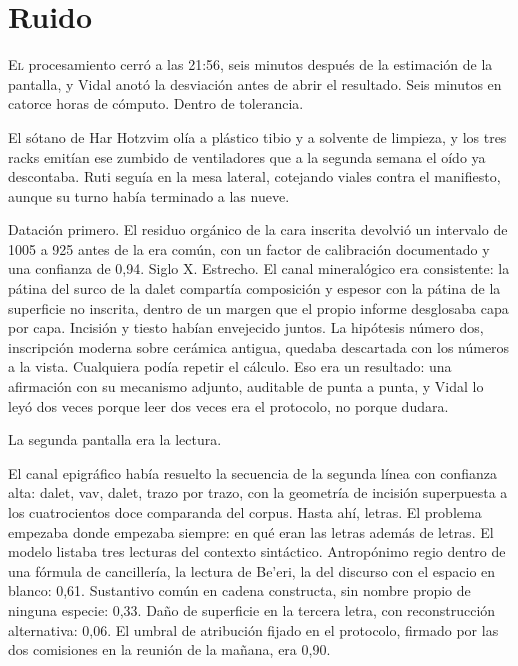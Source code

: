 \clearpage

\chapter{Ruido}

\lettrine[lines=2, lhang=0.1, nindent=0.2em]{E}{l} procesamiento cerró a las 21:56, seis minutos después de la estimación de la pantalla, y Vidal anotó la desviación antes de abrir el resultado. Seis minutos en catorce horas de cómputo. Dentro de tolerancia.


El sótano de Har Hotzvim olía a plástico tibio y a solvente de limpieza, y los tres racks emitían ese zumbido de ventiladores que a la segunda semana el oído ya descontaba. Ruti seguía en la mesa lateral, cotejando viales contra el manifiesto, aunque su turno había terminado a las nueve.

Datación primero. El residuo orgánico de la cara inscrita devolvió un intervalo de 1005 a 925 antes de la era común, con un factor de calibración documentado y una confianza de 0,94. Siglo X. Estrecho. El canal mineralógico era consistente: la pátina del surco de la dalet compartía composición y espesor con la pátina de la superficie no inscrita, dentro de un margen que el propio informe desglosaba capa por capa. Incisión y tiesto habían envejecido juntos. La hipótesis número dos, inscripción moderna sobre cerámica antigua, quedaba descartada con los números a la vista. Cualquiera podía repetir el cálculo. Eso era un resultado: una afirmación con su mecanismo adjunto, auditable de punta a punta, y Vidal lo leyó dos veces porque leer dos veces era el protocolo, no porque dudara.

La segunda pantalla era la lectura.

El canal epigráfico había resuelto la secuencia de la segunda línea con confianza alta: dalet, vav, dalet, trazo por trazo, con la geometría de incisión superpuesta a los cuatrocientos doce comparanda del corpus. Hasta ahí, letras. El problema empezaba donde empezaba siempre: en qué eran las letras además de letras. El modelo listaba tres lecturas del contexto sintáctico. Antropónimo regio dentro de una fórmula de cancillería, la lectura de Be'eri, la del discurso con el espacio en blanco: 0,61. Sustantivo común en cadena constructa, sin nombre propio de ninguna especie: 0,33. Daño de superficie en la tercera letra, con reconstrucción alternativa: 0,06. El umbral de atribución fijado en el protocolo, firmado por las dos comisiones en la reunión de la mañana, era 0,90.

